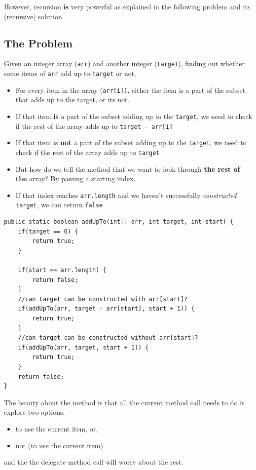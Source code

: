 However, recursion \textbf{is} very powerful as explained in the following problem and its (recursive) solution.


\subsection{The Problem}

Given an integer array (\texttt{arr}) and another integer (\texttt{target}), finding out whether some items of \texttt{arr} add up to \texttt{target} or not.

\begin{itemize}
  \item For every item in the array (\texttt{arr[i])}, either the item is a part of the subset that adds up to the target, or its not.
  \item If that item \textbf{is} a part of the subset adding up to the \texttt{target}, we need to check if the rest of the array adds up to \texttt{target - arr[i]}
  \item If that item is \textbf{not} a part of the subset adding up to the \texttt{target}, we need to check if the rest of the array adds up to \texttt{target}
  \item But how do we tell the method that we want to look through \textbf{the rest of the} array? By passing a starting index.
  \item If that index reaches \texttt{arr.length} and we haven't successfully \textit{constructed} \texttt{target}, we can return \texttt{false}
\end{itemize}

\newpage

\begin{lstlisting}
public static boolean addUpTo(int[] arr, int target, int start) {
	if(target == 0) {
		return true;
	}
	
	if(start == arr.length) {
		return false;
	}
	//can target can be constructed with arr[start]?
	if(addUpTo(arr, target - arr[start], start + 1)) {
		return true;
	}
	//can target can be constructed without arr[start]?
	if(addUpTo(arr, target, start + 1)) {
		return true;
	}
	return false;
}
\end{lstlisting}

The beauty about the method is that all the current method call needs to do is explore two options, 

\begin{itemize}
  \item to use the current item, or,
  \item not (to use the current item)
\end{itemize}

and the the delegate method call will worry about the rest.
